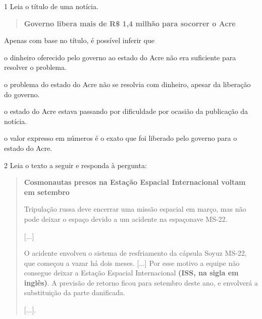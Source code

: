 \pagebreak
{}

\num{1} Leia o título de uma notícia.

\begin{quote}
\textbf{Governo libera mais de R\$ 1,4 milhão para socorrer o Acre}

\end{quote}

Apenas com base no título, é possível inferir que

\begin{escolha}
\item o dinheiro oferecido pelo governo ao estado do Acre não era suficiente para resolver o problema.

\item o problema do estado do Acre não se resolvia com dinheiro, apesar da liberação do governo.

\item o estado do Acre estava passando por dificuldade por ocasião da publicação da notícia.

\item o valor expresso em números é o exato que foi liberado pelo governo para o estado do Acre.
\end{escolha}


\num{2} Leia o texto a seguir e responda à pergunta:

\begin{quote}
\textbf{Cosmonautas presos na Estação Espacial Internacional voltam em
setembro}

Tripulação russa deve encerrar uma missão espacial em março, mas não
pode deixar o espaço devido a um acidente na espaçonave MS-22.

{[}...{]}

O acidente envolveu o sistema de resfriamento da cápsula Soyuz MS-22,
que começou a vazar há dois meses. {[}...{]} Por esse motivo a equipe
não consegue deixar a Estação Espacial Internacional \textbf{(ISS, na
sigla em inglês)}. A previsão de retorno ficou para setembro deste ano,
e envolverá a substituição da parte danificada.

{[}...{]}.

\end{quote}

